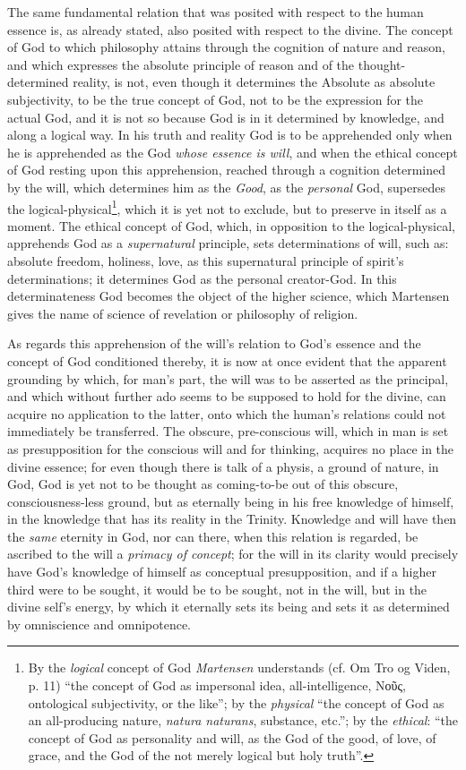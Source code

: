 \documentclass[12pt,a4paper]{book}
\begin{document}
The same fundamental relation that was posited with respect to the human essence
is, as already stated, also posited with respect to the divine. The concept of God
to which philosophy attains through the cognition of nature and reason, and which
expresses the absolute principle of reason and of the thought-determined reality,
is not, even though it determines the Absolute as absolute subjectivity, to be the
true concept of God, not to be the expression for the actual God, and it is not so
because God is in it determined by knowledge, and along a logical way. In his
truth and reality God is to be apprehended only when he is apprehended as the God
\emph{whose essence is will}, and when the ethical concept of God resting upon this
apprehension, reached through a cognition determined by the will, which determines
him as the \emph{Good}, as the \emph{personal} God, supersedes the
logical-physical\footnote{By the \emph{logical} concept of God \emph{Martensen} understands (cf.
Om Tro og Viden, p. 11) ``the concept of God as impersonal idea, all-intelligence,
Νοῦς, ontological subjectivity, or the like''; by the \emph{physical} ``the concept of
God as an all-producing nature, \textit{natura naturans}, substance, etc.''; by the
\emph{ethical}: ``the concept of God as personality and will, as the God of the good, of
love, of grace, and the God of the not merely logical but holy truth''.}, which it
is yet not to exclude, but to preserve in itself as a moment. The ethical concept
of God, which, in opposition to the logical-physical, apprehends God as a
\emph{supernatural} principle, sets determinations of will, such as: absolute freedom,
holiness, love, as this supernatural principle of spirit's determinations; it
determines God as the personal creator-God. In this determinateness God becomes
the object of the higher science, which Martensen gives the name of science of
revelation or philosophy of religion.

As regards this apprehension of the will's relation to God's essence and the
concept of God conditioned thereby, it is now at once evident that the apparent
grounding by which, for man's part, the will was to be asserted as the principal,
and which without further ado seems to be supposed to hold for the divine, can
acquire no application to the latter, onto which the human's relations could not
immediately be transferred. The obscure, pre-conscious will, which in man is set as
presupposition for the conscious will and for thinking, acquires no place in the
divine essence; for even though there is talk of a physis, a ground of nature, in
God, God is yet not to be thought as coming-to-be out of this obscure,
consciousness-less ground, but as eternally being in his free knowledge of
himself, in the knowledge that has its reality in the Trinity. Knowledge and will
have then the \emph{same} eternity in God, nor can there, when this relation is regarded,
be ascribed to the will a \emph{primacy of concept}; for the will in its clarity would
precisely have God's knowledge of himself as conceptual presupposition, and if a
higher third were to be sought, it would be to be sought, not in the will, but in
the divine self's energy, by which it eternally sets its being and sets it as
determined by omniscience and omnipotence.
\end{document}

